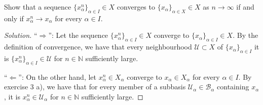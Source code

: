 \documentclass[a4paper]{article}
\theoremstyle{definition}
\begin{document}
Show that a sequence \(\{x_\alpha^n\}_{\alpha \in I} \in X\) converges to \(\{x_\alpha\}_{\alpha \in X} \in X\) as \(n \longrightarrow \infty\) if and only if \(x^n_\alpha \longrightarrow x_\alpha\) for every \(\alpha \in I\).

\begin{proof}[Solution]
    ``\(\Rightarrow\)'': Let the sequence \(\{x_\alpha^n\}_{\alpha \in I} \in X\) converge to \(\{x_\alpha\}_{\alpha \in I} \in X\). By the definition of convergence, we have that every neighbourhood \(\mathcal{U} \subset X\) of \(\{x_\alpha\}_{\alpha \in I}\) it is \(\{x_\alpha^n\}_{\alpha \in I} \in \mathcal{U}\) for \(n \in \mathbb{N}\) sufficiently large.

    ``\(\Leftarrow\)'': On the other hand, let \(x^n_\alpha \in X_\alpha\) converge to \(x_\alpha \in X_\alpha\) for every \(\alpha \in I\). By exercise 3 a), we have that for every member of a subbasis \(\mathcal{U}_\alpha \in \mathcal{B}_\alpha\) containing \(x_\alpha\), it is \(x_\alpha^n \in \mathcal{U}_\alpha\) for \(n \in \mathbb{N}\) sufficiently large.
\end{proof}
\end{document}
